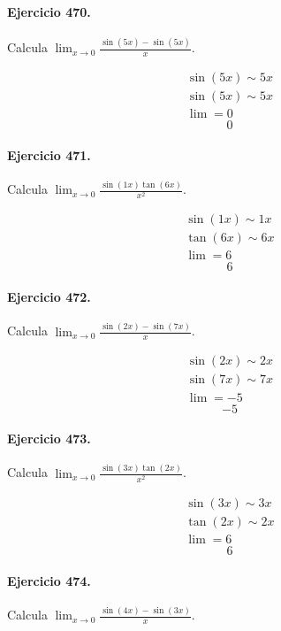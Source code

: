 \documentclass[11pt,a4paper]{article}
\begin{document}
\paragraph{Ejercicio 470.} Calcula $\displaystyle\lim_{x\to0}\frac{\sin(5x)-\sin(5x)}{x}$.

\[
\begin{aligned}
\sin(5x)\sim 5x\\
\sin(5x)\sim 5x\\
\lim=0
\end{aligned}
\]
\[\boxed{0}\]


\paragraph{Ejercicio 471.} Calcula $\displaystyle\lim_{x\to0}\frac{\sin(1x)\tan(6x)}{x^2}$.

\[
\begin{aligned}
\sin(1x)\sim 1x\\
\tan(6x)\sim 6x\\
\lim=6
\end{aligned}
\]
\[\boxed{6}\]


\paragraph{Ejercicio 472.} Calcula $\displaystyle\lim_{x\to0}\frac{\sin(2x)-\sin(7x)}{x}$.

\[
\begin{aligned}
\sin(2x)\sim 2x\\
\sin(7x)\sim 7x\\
\lim=-5
\end{aligned}
\]
\[\boxed{-5}\]


\paragraph{Ejercicio 473.} Calcula $\displaystyle\lim_{x\to0}\frac{\sin(3x)\tan(2x)}{x^2}$.

\[
\begin{aligned}
\sin(3x)\sim 3x\\
\tan(2x)\sim 2x\\
\lim=6
\end{aligned}
\]
\[\boxed{6}\]


\paragraph{Ejercicio 474.} Calcula $\displaystyle\lim_{x\to0}\frac{\sin(4x)-\sin(3x)}{x}$.
\end{document}
